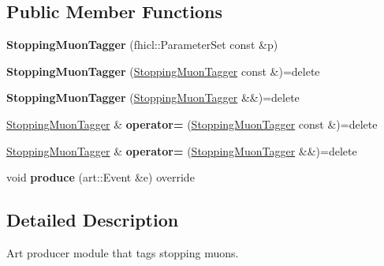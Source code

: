 \subsection*{Public Member Functions}
\begin{DoxyCompactItemize}
\item 
\hypertarget{classStoppingMuonTagger_a3ebd20018e8b0899e94bb3a01cc718be}{{\bfseries Stopping\-Muon\-Tagger} (fhicl\-::\-Parameter\-Set const \&p)}\label{classStoppingMuonTagger_a3ebd20018e8b0899e94bb3a01cc718be}

\item 
\hypertarget{classStoppingMuonTagger_a6a544fa555882979e4e288c91a362d75}{{\bfseries Stopping\-Muon\-Tagger} (\hyperlink{classStoppingMuonTagger}{Stopping\-Muon\-Tagger} const \&)=delete}\label{classStoppingMuonTagger_a6a544fa555882979e4e288c91a362d75}

\item 
\hypertarget{classStoppingMuonTagger_a9b6df4c680a52bfcc04a6c870d8b02c1}{{\bfseries Stopping\-Muon\-Tagger} (\hyperlink{classStoppingMuonTagger}{Stopping\-Muon\-Tagger} \&\&)=delete}\label{classStoppingMuonTagger_a9b6df4c680a52bfcc04a6c870d8b02c1}

\item 
\hypertarget{classStoppingMuonTagger_aa694be13fa360184be18359f555e788e}{\hyperlink{classStoppingMuonTagger}{Stopping\-Muon\-Tagger} \& {\bfseries operator=} (\hyperlink{classStoppingMuonTagger}{Stopping\-Muon\-Tagger} const \&)=delete}\label{classStoppingMuonTagger_aa694be13fa360184be18359f555e788e}

\item 
\hypertarget{classStoppingMuonTagger_a79fe9dd28e135cca483643a3b158656a}{\hyperlink{classStoppingMuonTagger}{Stopping\-Muon\-Tagger} \& {\bfseries operator=} (\hyperlink{classStoppingMuonTagger}{Stopping\-Muon\-Tagger} \&\&)=delete}\label{classStoppingMuonTagger_a79fe9dd28e135cca483643a3b158656a}

\item 
\hypertarget{classStoppingMuonTagger_acc39137db682cee3fac909296244b77a}{void {\bfseries produce} (art\-::\-Event \&e) override}\label{classStoppingMuonTagger_acc39137db682cee3fac909296244b77a}

\end{DoxyCompactItemize}


\subsection{Detailed Description}
Art producer module that tags stopping muons. 

